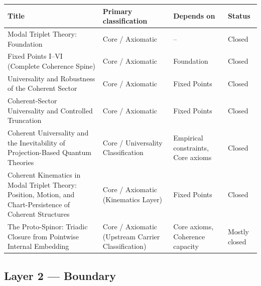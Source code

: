 \documentclass[11pt]{article}
\begin{document}
\begin{center}
\small
\begin{tabular}{|p{7.2cm}|p{3.6cm}|p{3.6cm}|p{1.6cm}|}
\hline
\textbf{Title} & \textbf{Primary classification} & \textbf{Depends on} & \textbf{Status}\\
\hline
Modal Triplet Theory: Foundation
& Core / Axiomatic & -- & Closed\\
\hline
Fixed Points I--VI (Complete Coherence Spine)
& Core / Axiomatic & Foundation & Closed\\
\hline
Universality and Robustness of the Coherent Sector
& Core / Axiomatic & Fixed Points & Closed\\
\hline
Coherent-Sector Universality and Controlled Truncation
& Core / Axiomatic & Fixed Points & Closed\\
\hline
Coherent Universality and the Inevitability of Projection-Based Quantum Theories
& Core / Universality Classification
& Empirical constraints, Core axioms
& Closed\\
\hline
Coherent Kinematics in Modal Triplet Theory: Position, Motion, and Chart-Persistence of Coherent Structures
& Core / Axiomatic (Kinematics Layer) & Fixed Points & Closed \\
\hline
The Proto-Spinor: Triadic Closure from Pointwise Internal Embedding
& Core / Axiomatic (Upstream Carrier Classification)
& Core axioms, Coherence capacity
& Mostly closed \\
\hline
\end{tabular}
\end{center}

\subsection{Layer 2 --- Boundary}
\end{document}
